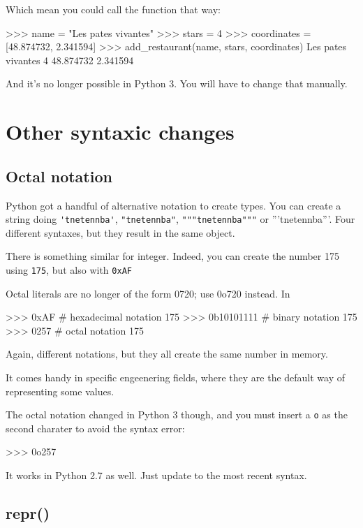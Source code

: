 \begin{py2}
\begin{py2}
\begin{py2and3}
\begin{py2and3}
Which mean you could call the function that way:

\begin{py2}
>>> name = "Les pates vivantes"
>>> stars = 4
>>> coordinates = [48.874732, 2.341594]
>>> add_restaurant(name, stars, coordinates)
Les pates vivantes
4
48.874732
2.341594
\end{py2}

And it's no longer possible in Python 3. You will have to change that manually.

\section{Other syntaxic changes}

\subsection{Octal notation}

Python got a handful of alternative notation to create types. You can create a string doing \lstinline{'tnetennba'}, \lstinline{"tnetennba"}, \lstinline{"""tnetennba"""} or {'''tnetennba'''}. Four different syntaxes, but they result in the same object.

There is something similar for integer. Indeed, you can create the number 175 using \lstinline{175}, but also with \lstinline{0xAF}

Octal literals are no longer of the form 0720; use 0o720 instead. In

\begin{py2}
>>> 0xAF # hexadecimal notation
175
>>> 0b10101111 # binary notation
175
>>> 0257 # octal notation
175
\end{py2}

Again, different notations, but they all create the same number in memory.

It comes handy in specific engeenering fields, where they are the default way of representing some values.

The octal notation changed in Python 3 though, and you must insert a \lstinline{o} as the second charater to avoid the syntax error:

\begin{py2and3}
>>> 0o257
\begin{py2and3}

It works in Python 2.7 as well. Just update to the most recent syntax.

\subsection{repr()}


\end{py2and3}
\end{py2and3}
\end{py2and3}
\end{py2and3}
\end{py2}
\end{py2}
